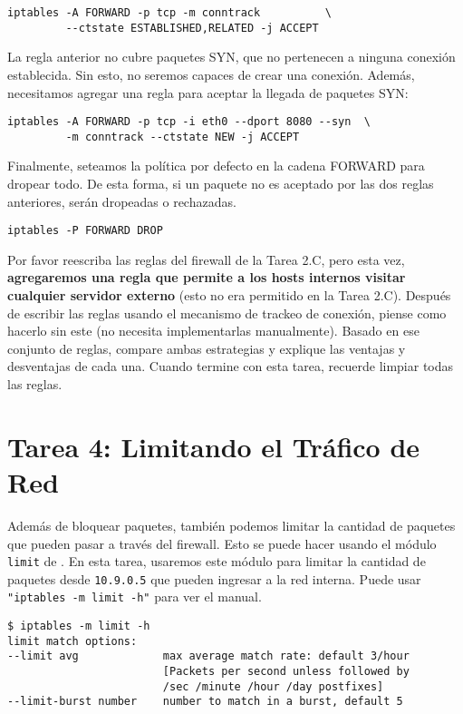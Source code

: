 \begin{lstlisting}
iptables -A FORWARD -p tcp -m conntrack          \
         --ctstate ESTABLISHED,RELATED -j ACCEPT
\end{lstlisting}

La regla anterior no cubre paquetes SYN, que no pertenecen a ninguna conexión establecida. Sin esto, no seremos capaces de crear una conexión. Además, necesitamos agregar una regla para aceptar la llegada de paquetes SYN:

\begin{lstlisting}
iptables -A FORWARD -p tcp -i eth0 --dport 8080 --syn  \
         -m conntrack --ctstate NEW -j ACCEPT 
\end{lstlisting}

Finalmente, seteamos la política por defecto en la cadena FORWARD para dropear todo. De esta forma, si un paquete no es aceptado por las dos reglas anteriores, serán dropeadas o rechazadas.


\begin{lstlisting}
iptables -P FORWARD DROP
\end{lstlisting}

Por favor reescriba las reglas del firewall de la Tarea 2.C, pero esta vez, \textbf{agregaremos una regla que permite a los hosts internos visitar cualquier servidor externo} (esto no era permitido en la Tarea 2.C).
Después de escribir las reglas usando el mecanismo de trackeo de conexión, piense como hacerlo sin este (no necesita implementarlas manualmente).
Basado en ese conjunto de reglas, compare ambas estrategias y explique las ventajas y desventajas de cada una.
Cuando termine con esta tarea, recuerde limpiar todas las reglas.



\section{Tarea 4: Limitando el Tráfico de Red}

Además de bloquear paquetes, también podemos
limitar la cantidad de paquetes que pueden pasar a través del firewall.
Esto se puede hacer usando el módulo \texttt{limit} de \iptables.
En esta tarea, usaremos este módulo para limitar la cantidad de paquetes
desde \texttt{10.9.0.5} que pueden ingresar a la red interna.
Puede usar \texttt{"iptables -m limit -h"} para ver el manual.

\begin{lstlisting}
$ iptables -m limit -h
limit match options:
--limit avg             max average match rate: default 3/hour
                        [Packets per second unless followed by
                        /sec /minute /hour /day postfixes]
--limit-burst number    number to match in a burst, default 5
\end{lstlisting}
 
